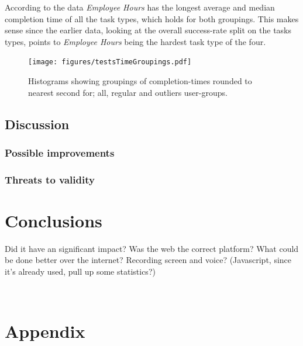 \documentclass[nofilelist,dvipsnames]{cslthse-msc}
\begin{document}
        According to the data \textit{Employee Hours} has the longest average
        and median completion time of all the task types, which holds for both
        groupings. This makes sense since the earlier data, looking at the
        overall success-rate split on the tasks types, points to
        \textit{Employee Hours} being the hardest task type of the four.

        \begin{figure}[h!]
          \centering
          \texttt{[image: figures/testsTimeGroupings.pdf]}
          \caption{
            Histograms showing groupings of completion-times rounded to nearest
            second for; all, regular and outliers user-groups.
          }
        \end{figure}


		\section{Discussion}

			\subsection{Possible improvements}

			\subsection{Threats to validity}





	\chapter{Conclusions}

		Did it have an significant impact? Was the web the correct platform? What
		could be done better over the internet? Recording screen and voice?
		(Javascript, since it's already used, pull up some statistics?)


	\checkoddpage
	\ifoddpage
	\else
		 \newpage
		 \thispagestyle{empty}
		 \mbox{ }
	\fi

  \chapter{Appendix}
\end{document}
